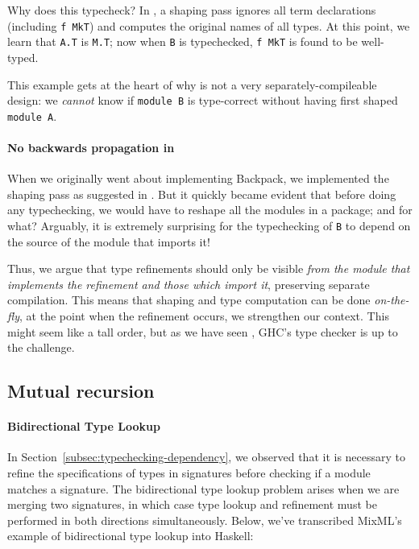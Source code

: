 \noindent
Why does this typecheck?  In \OldBackpack{}, a shaping pass ignores
all term declarations (including \verb|f MkT|) and computes the
original names of all types.  At this point, we learn that \verb|A.T|
is \verb|M.T|; now when \verb|B| is typechecked, \verb|f MkT| is found
to be well-typed.

This example gets at the heart of why \OldBackpack{} is not a very
separately-compileable design: we \emph{cannot} know if \verb|module B| is
type-correct without having first shaped \verb|module A|.

\paragraph{No backwards propagation in \Backpack{}}  When we originally
went about implementing Backpack, we implemented the shaping pass
as suggested in \OldBackpack{}.  But it quickly became evident that before
doing any typechecking, we would have to reshape all the modules in a package;
and for what?  Arguably, it is extremely surprising for the typechecking of
\verb|B| to depend on the source of the module that imports it!

Thus, we argue that type refinements should only be visible \emph{from the
module that implements the refinement and those which import it},
preserving separate compilation.  This means that shaping and type
computation can be done \emph{on-the-fly}, at the point when the refinement
occurs, we strengthen our context.  This might seem like a tall order,
but as we have seen , GHC's type checker is up to the challenge.

\subsection{Mutual recursion}

\paragraph{Bidirectional Type Lookup}

In Section~\ref{subsec:typechecking-dependency}, we observed that
it is necessary to refine the specifications of types in signatures
before checking if a module matches a signature.  The bidirectional
type lookup problem arises when we are merging two signatures, in
which case type lookup and refinement must be performed in both
directions simultaneously.  Below, we've transcribed MixML's
example of bidirectional type lookup into Haskell:

